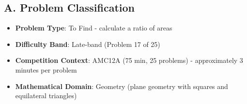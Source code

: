 \documentclass[]{article}
\begin{document}
\begin{problemconfigbox}
\subsection*{A. Problem Classification}
\begin{itemize}[leftmargin=*]
    \item \textbf{Problem Type}: To Find - calculate a ratio of areas
    \item \textbf{Difficulty Band}: Late-band (Problem 17 of 25)
    \item \textbf{Competition Context}: AMC12A (75 min, 25 problems) - approximately 3 minutes per problem
    \item \textbf{Mathematical Domain}: Geometry (plane geometry with squares and equilateral triangles)
\end{itemize}


\end{problemconfigbox}
\end{document}
